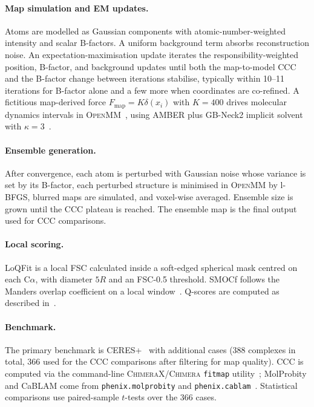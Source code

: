 \documentclass[11pt]{article}
\begin{document}
\paragraph{Map simulation and EM updates.} Atoms are modelled as Gaussian components with atomic-number-weighted intensity and scalar B-factors. A uniform background term absorbs reconstruction noise. An expectation-maximisation update iterates the responsibility-weighted position, B-factor, and background updates until both the map-to-model CCC and the B-factor change between iterations stabilise, typically within 10--11 iterations for B-factor alone and a few more when coordinates are co-refined. A fictitious map-derived force $F_{\mathrm{map}}=K\delta(x_{i})$ with $K=400$ drives molecular dynamics intervals in \textsc{OpenMM}~\cite{eastman2017}, using AMBER plus GB-Neck2 implicit solvent with $\kappa=3$~\cite{nguyen2013}.

\paragraph{Ensemble generation.} After convergence, each atom is perturbed with Gaussian noise whose variance is set by its B-factor, each perturbed structure is minimised in \textsc{OpenMM} by l-BFGS, blurred maps are simulated, and voxel-wise averaged. Ensemble size is grown until the CCC plateau is reached. The ensemble map is the final output used for CCC comparisons.

\paragraph{Local scoring.} LoQFit is a local FSC calculated inside a soft-edged spherical mask centred on each C$\alpha$, with diameter $5R$ and an FSC-0.5 threshold. SMOCf follows the Manders overlap coefficient on a local window~\cite{farabella2015,joseph2017}. Q-scores are computed as described in~\cite{pintilie2020}.

\paragraph{Benchmark.} The primary benchmark is CERES+~\cite{liebschner2019} with additional cases (388 complexes in total, 366 used for the CCC comparisons after filtering for map quality). CCC is computed via the command-line \textsc{ChimeraX}/\textsc{Chimera} \texttt{fitmap} utility~\cite{goddard2018,pettersen2021}; MolProbity and CaBLAM come from \texttt{phenix.molprobity} and \texttt{phenix.cablam}~\cite{williams2018,chen2010}. Statistical comparisons use paired-sample $t$-tests over the 366 cases.
\end{document}
